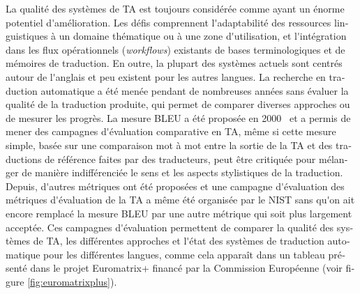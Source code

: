 \documentclass[]{../metanetpaper}
\begin{document}
\begin{french}
\begin{multicols}{2}
La qualité des systèmes de TA est toujours considérée comme ayant un
énorme potentiel d{\mbox '}amélioration. Les défis comprennent l{\mbox '}adaptabilité
des ressources linguistiques à un domaine thématique ou à une zone
d{\mbox '}utilisation, et l{\mbox '}intégration dans les flux opérationnels ({\em workflows}) existants de bases
terminologiques et de mémoires de traduction. En outre, la plupart des
systèmes actuels sont centrés autour de l{\mbox '}anglais et peu existent pour
les autres langues. La recherche en traduction automatique a été menée
pendant de nombreuses années sans évaluer la qualité de la traduction
produite, qui permet de comparer diverses approches ou de mesurer les
progrès. La mesure BLEU a été proposée en 2000~\cite{bleu02} et a permis de mener
des campagnes d{\mbox '}évaluation comparative en TA, même si cette mesure
simple, basée sur une comparaison mot à mot entre la sortie de la
TA et des traductions de référence faites par des
traducteurs, peut être critiquée pour mélanger de manière
indifférenciée le sens et les aspects stylistiques de la
traduction. Depuis, d{\mbox '}autres métriques ont été proposées et une
campagne d{\mbox '}évaluation des métriques d{\mbox '}évaluation de la TA a même été
organisée par le NIST sans qu{\mbox '}on ait encore remplacé la mesure BLEU
par une autre métrique qui soit plus largement acceptée. Ces campagnes
d{\mbox '}évaluation permettent de comparer la qualité des systèmes de TA, les
différentes approches et l{\mbox '}état des systèmes de traduction automatique pour les
différentes langues, comme cela apparaît dans un tableau présenté dans
le projet Euromatrix+ financé par la Commission Européenne (voir figure \ref{fig:euromatrixplus}).


\end{multicols}
\end{french}
\end{document}
